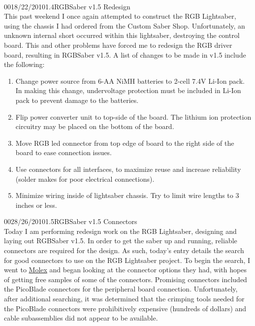 \documentclass[12pt,letterpaper,onecolumn]{article}
\begin{document}
\\

\begin{nbentry}{001}{8/22/2010}{1.4}{RGBSaber v1.5 Redesign}
\\	This past weekend I once again attempted to construct the RGB Lightsaber, using the chassis I had ordered from the Custom Saber Shop. Unfortunately, an unknown internal short occurred within this lightsaber, destroying the control board. This and other problems have forced me to redesign the RGB driver board, resulting in RGBSaber v1.5. A list of changes to be made in v1.5 include the following:
\begin{enumerate}
\item Change power source from 6-AA NiMH batteries to 2-cell 7.4V Li-Ion pack. In making this change, undervoltage protection must be included in Li-Ion pack to prevent damage to the batteries.
\item Flip power converter unit to top-side of the board. The lithium ion protection circuitry may be placed on the bottom of the board.
\item Move RGB led connector from top edge of board to the right side of the board to ease connection issues.
\item Use connectors for all interfaces, to maximize reuse and increase reliability (solder makes for poor electrical connections).
\item Minimize wiring inside of lightsaber chassis. Try to limit wire lengths to 3 inches or less.
\end{enumerate}
\end{nbentry}

\begin{nbentry}{002}{8/26/2010}{1.5}{RGBSaber v1.5 Connectors}
\\
	Today I am performing redesign work on the RGB Lightsaber, designing and laying out RGBSaber v1.5. In order to get the saber up and running, reliable connectors are required for the design. As such, today's entry details the search for good connectors to use on the RGB Lightsaber project.
	To begin the search, I went to \href{http://www.molex.com/}{Molex} and began looking at the connector options they had, with hopes of getting free samples of some of the connectors. Promising connectors included the PicoBlade connectors for the peripheral board connection. Unfortunately, after additional searching, it was determined that the crimping tools needed for the PicoBlade connectors were prohibitively expensive (hundreds of dollars) and cable subassemblies did not appear to be available.
\end{nbentry}
\end{document}
